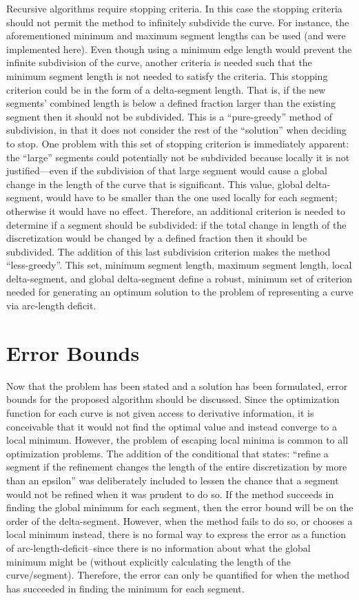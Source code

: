 \documentclass[preprint,12pt]{elsarticle}
\begin{document}
Recursive algorithms require stopping criteria.  In this case the stopping criteria should not permit the method to infinitely subdivide the curve.  For instance, the aforementioned minimum and maximum segment lengths can be used (and were implemented here).  Even though using a minimum edge length would prevent the infinite subdivision of the curve, another criteria is needed such that the minimum segment length is not needed to satisfy the criteria.  This stopping criterion could be in the form of a delta-segment length.  That is, if the new segments’ combined length is below a defined fraction larger than the existing segment then it should not be subdivided.  This is a ``pure-greedy'' method of subdivision, in that it does not consider the rest of the ``solution'' when deciding to stop.  One problem with this set of stopping criterion is immediately apparent: the ``large'' segments could potentially not be subdivided because locally it is not justified—even if the subdivision of that large segment would cause a global change in the length of the curve that is significant.  This value, global delta-segment, would have to be smaller than the one used locally for each segment; otherwise it would have no effect.  Therefore, an additional criterion is needed to determine if a segment should be subdivided: if the total change in length of the discretization would be changed by a defined fraction then it should be subdivided.  The addition of this last subdivision criterion makes the method ``less-greedy''.  This set, minimum segment length, maximum segment length, local delta-segment, and global delta-segment define a robust, minimum set of criterion needed for generating an optimum solution to the problem of representing a curve via arc-length deficit.

\section{Error Bounds}
Now that the problem has been stated and a solution has been formulated, error bounds for the proposed algorithm should be discussed.  Since the optimization function for each curve is not given access to derivative information, it is conceivable that it would not find the optimal value and instead converge to a local minimum.  However, the problem of escaping local minima is common to all optimization problems.  The addition of the conditional that states: ``refine a segment if the refinement changes the length of the entire discretization by more than an epsilon'' was deliberately included to lessen the chance that a segment would not be refined when it was prudent to do so.  If the method succeeds in finding the global minimum for each segment, then the error bound will be on the order of the delta-segment.  However, when the method fails to do so, or chooses a local minimum instead, there is no formal way to express the error as a function of arc-length-deficit--since there is no information about what the global minimum might be (without explicitly calculating the length of the curve/segment).  Therefore, the error can only be quantified for when the method has succeeded in finding the minimum for each segment.
\end{document}
